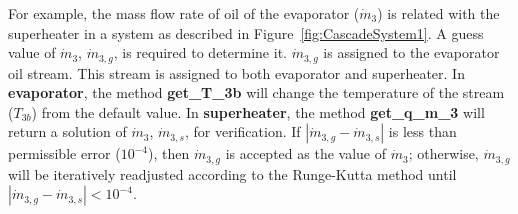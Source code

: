 For example, the mass flow rate of oil of the evaporator ($\dot{m}_3$) is related with the superheater in a system as described in Figure~\ref{fig:CascadeSystem1}.
A guess value of $\dot{m}_3$, $\dot{m}_{3,g}$, is required to determine it. $\dot{m}_{3,g}$ is assigned to the evaporator oil stream. This stream is assigned to both evaporator and superheater. In \textbf{evaporator}, the method \textbf{get\_T\_3b} will change the temperature of the stream ($T_{3b}$) from the default value. 
In \textbf{superheater}, the method \textbf{get\_q\_m\_3} will return a solution of $\dot{m}_3$, $\dot{m}_{3,s}$, for verification. If $\left|\dot{m}_{3,g} - \dot{m}_{3,s}\right|$ is less than permissible error ($10^{-4}$), then $\dot{m}_{3,g}$ is accepted as the value of $\dot{m}_{3}$; otherwise, $\dot{m}_{3,g}$ will be iteratively readjusted according to the Runge-Kutta method until $\left|\dot{m}_{3,g} - \dot{m}_{3,s}\right| < 10^{-4}$.
